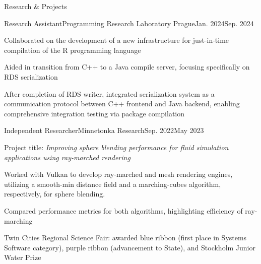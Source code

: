 \documentclass{resume} %
\begin{document}
\begin{rSection}{Research \& Projects}
  \begin{rItem}{Research Assistant}{Programming Research Laboratory Prague}{Jan. 2024}{Sep. 2024}
    \item Collaborated on the development of a new infrastructure for just-in-time compilation of the R programming language
    \item Aided in transition from C++ to a Java compile server, focusing specifically on RDS serialization
    \item After completion of RDS writer, integrated serialization system as a communication protocol between C++ frontend and
    Java backend, enabling comprehensive integration testing via package compilation  \end{rItem}

  \begin{rItem}{Independent Researcher}{Minnetonka Research}{Sep. 2022}{May 2023}
    \item Project title: {\em Improving sphere blending performance for fluid simulation applications using ray-marched rendering}
    \item Worked with Vulkan to develop ray-marched and mesh rendering engines, utilizing a smooth-min distance field and a marching-cubes algorithm, respectively, for sphere blending.
    \item Compared performance metrics for both algorithms, highlighting efficiency of ray-marching
    \item Twin Cities Regional Science Fair: awarded blue ribbon (first place in Systems Software category), purple ribbon (advancement to State), and Stockholm Junior Water Prize
  \end{rItem}
\end{rSection}

\end{document}
